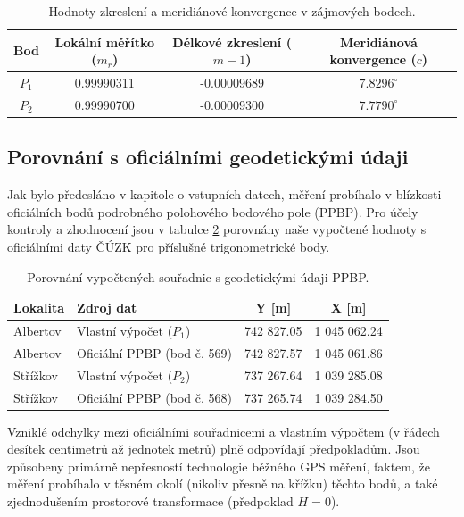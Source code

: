 \documentclass[12pt, a4paper]{article}
\begin{document}
\begin{table}[h!]
\centering
\begin{tabular}{|c|c|c|c|}
\hline
\textbf{Bod} & \textbf{Lokální měřítko ($m_r$)} & \textbf{Délkové zkreslení ($m-1$)} & \textbf{Meridiánová konvergence ($c$)} \\ \hline
$P_1$ & 0.99990311 & -0.00009689 & $7.8296^\circ$ \\ \hline
$P_2$ & 0.99990700 & -0.00009300 & $7.7790^\circ$ \\ \hline
\end{tabular}
\caption{Hodnoty zkreslení a meridiánové konvergence v zájmových bodech.}
\label{tab:zkresleni}
\end{table}

\subsection{Porovnání s oficiálními geodetickými údaji}
Jak bylo předesláno v kapitole o vstupních datech, měření probíhalo v blízkosti oficiálních bodů podrobného polohového bodového pole (PPBP). Pro účely kontroly a zhodnocení jsou v tabulce \ref{tab:porovnani} porovnány naše vypočtené hodnoty s oficiálními daty ČÚZK pro příslušné trigonometrické body.

\begin{table}[h!]
\centering
\begin{tabular}{|l|l|c|c|}
\hline
\textbf{Lokalita} & \textbf{Zdroj dat} & \textbf{Y [m]} & \textbf{X [m]} \\ \hline
Albertov & Vlastní výpočet ($P_1$) & 742 827.05 & 1 045 062.24 \\ \hline
Albertov & Oficiální PPBP (bod č. 569) & 742 827.57 & 1 045 061.86 \\ \hline \hline
Střížkov & Vlastní výpočet ($P_2$) & 737 267.64 & 1 039 285.08 \\ \hline
Střížkov & Oficiální PPBP (bod č. 568) & 737 265.74 & 1 039 284.50 \\ \hline
\end{tabular}
\caption{Porovnání vypočtených souřadnic s geodetickými údaji PPBP.}
\label{tab:porovnani}
\end{table}

Vzniklé odchylky mezi oficiálními souřadnicemi a vlastním výpočtem (v řádech desítek centimetrů až jednotek metrů) plně odpovídají předpokladům. Jsou způsobeny primárně nepřesností technologie běžného GPS měření, faktem, že měření probíhalo v těsném okolí (nikoliv přesně na křížku) těchto bodů, a také zjednodušením prostorové transformace (předpoklad $H=0$).
\end{document}
